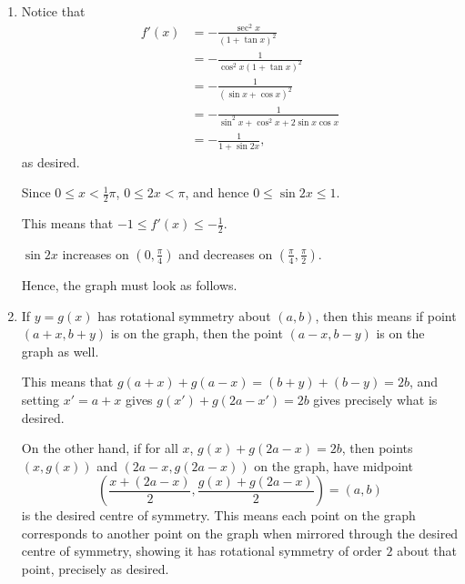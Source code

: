 \Question{\currfilebase}

\begin{enumerate}
    \item Notice that
          \begin{align*}
              f'(x) & = - \frac{\sec^2 x}{\left(1 + \tan x\right)^2}      \\
                    & = - \frac{1}{\cos^2 x \left(1 + \tan x\right)^2}    \\
                    & = - \frac{1}{\left(\sin x + \cos x\right)^2}        \\
                    & = - \frac{1}{\sin^2 x + \cos^2 x + 2 \sin x \cos x} \\
                    & = - \frac{1}{1 + \sin 2x},
          \end{align*}
          as desired.

          Since \(0 \leq x < \frac{1}{2}\pi\), \(0 \leq 2x < \pi\), and hence \(0 \leq \sin 2x \leq 1\).

          This means that \(-1 \leq f'(x) \leq -\frac{1}{2}\).

          \(\sin 2x\) increases on \(\left(0, \frac{\pi}{4}\right)\) and decreases on \(\left(\frac{\pi}{4}, \frac{\pi}{2}\right)\).

          Hence, the graph must look as follows.

          \begin{center}
            
          \end{center}

    \item If \(y = g(x)\) has rotational symmetry about \((a, b)\), then this means if point \((a + x, b + y)\) is on the graph, then the point \((a - x, b - y)\) is on the graph as well.

          This means that \(g(a + x) + g(a - x) = (b + y) + (b - y) = 2b\), and setting \(x' = a + x\) gives \(g(x') + g(2a - x') = 2b\) gives precisely what is desired.

          On the other hand, if for all \(x\), \(g(x) + g(2a - x) = 2b\), then points \((x, g(x))\) and \((2a - x, g(2a - x))\) on the graph, have midpoint
          \[
              \left(\frac{x + (2a - x)}{2}, \frac{g(x) + g(2a - x)}{2}\right) = (a, b)
          \]
          is the desired centre of symmetry. This means each point on the graph corresponds to another point on the graph when mirrored through the desired centre of symmetry, showing it has rotational symmetry of order \(2\) about that point, precisely as desired.


\end{enumerate}
